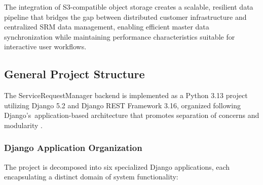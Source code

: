 The integration of S3-compatible object storage creates a scalable, resilient data pipeline that bridges the gap between distributed customer infrastructure and centralized SRM data management, enabling efficient master data synchronization while maintaining performance characteristics suitable for interactive user workflows.

\subsection{General Project Structure}

The ServiceRequestManager backend is implemented as a Python 3.13 project utilizing Django 5.2 and Django REST Framework 3.16, organized following Django's~application-based architecture that promotes separation of concerns and modularity \cite{django}.

\subsubsection{Django Application Organization}

The project is decomposed into six specialized Django applications, each encapsulating a distinct domain of system functionality:

